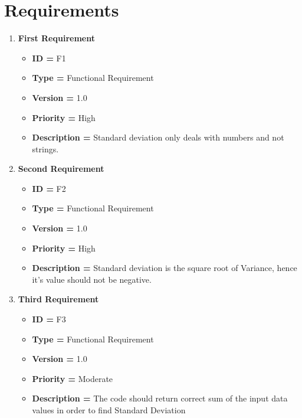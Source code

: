 \documentclass[12pt,a4paper]{report}
\begin{document}
\section{Requirements}
\begin{enumerate}[noitemsep]
        \item \textbf{First Requirement}
        \begin{itemize}[noitemsep]
            \item \textbf{ID = } F1
            \item\textbf{Type = } Functional Requirement
            \item\textbf{Version = } 1.0
            \item\textbf{Priority = } High
            \item\textbf{Description = } Standard deviation only deals with numbers and not strings.
        \end{itemize}
        \item \textbf{Second Requirement}
        \begin{itemize}[noitemsep]
            \item \textbf{ID = } F2
            \item\textbf{Type = } Functional Requirement
            \item\textbf{Version = } 1.0
            \item\textbf{Priority = } High
            \item\textbf{Description = } Standard deviation is the square root of Variance, hence it's value should not be negative.
        \end{itemize}
        \item \textbf{Third Requirement}
        \begin{itemize}[noitemsep]
            \item \textbf{ID = } F3
            \item\textbf{Type = } Functional Requirement
            \item\textbf{Version = } 1.0
            \item\textbf{Priority = } Moderate
            \item\textbf{Description = }  The code should return correct sum of the input data values in order to find Standard Deviation
        \end{itemize}
        

\end{enumerate}
\end{document}
